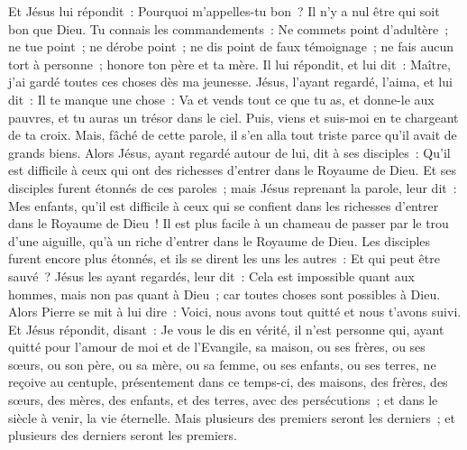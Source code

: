 \begin{multicols}{2}
Et Jésus lui répondit~: Pourquoi m'appelles-tu bon~? Il n'y a nul être qui soit bon que Dieu.
Tu connais les commandements~: Ne commets point d'adultère~; ne tue point~; ne dérobe point~; ne dis point de faux témoignage~; ne fais aucun tort à personne~; honore ton père et ta mère.
Il lui répondit, et lui dit~: Maître, j'ai gardé toutes ces choses dès ma jeunesse.
Jésus, l'ayant regardé, l'aima, et lui dit~: Il te manque une chose~: Va et vends tout ce que tu as, et donne-le aux pauvres, et tu auras un trésor dans le ciel. Puis, viens et suis-moi en te chargeant de ta croix.
Mais, fâché de cette parole, il s'en alla tout triste parce qu'il avait de grands biens.
Alors Jésus, ayant regardé autour de lui, dit à ses disciples~: Qu'il est difficile à ceux qui ont des richesses d'entrer dans le Royaume de Dieu.
Et ses disciples furent étonnés de ces paroles~; mais Jésus reprenant la parole, leur dit~: Mes enfants, qu'il est difficile à ceux qui se confient dans les richesses d'entrer dans le Royaume de Dieu~!
Il est plus facile à un chameau de passer par le trou d'une aiguille, qu'à un riche d'entrer dans le Royaume de Dieu.
Les disciples furent encore plus étonnés, et ils se dirent les uns les autres~: Et qui peut être sauvé~?
Jésus les ayant regardés, leur dit~: Cela est impossible quant aux hommes, mais non pas quant à Dieu~; car toutes choses sont possibles à Dieu.
Alors Pierre se mit à lui dire~: Voici, nous avons tout quitté et nous t'avons suivi.
Et Jésus répondit, disant~: Je vous le dis en vérité, il n'est personne qui, ayant quitté pour l'amour de moi et de l'Evangile, sa maison, ou ses frères, ou ses sœurs, ou son père, ou sa mère, ou sa femme, ou ses enfants, ou ses terres,
ne reçoive au centuple, présentement dans ce temps-ci, des maisons, des frères, des sœurs, des mères, des enfants, et des terres, avec des persécutions~; et dans le siècle à venir, la vie éternelle.
Mais plusieurs des premiers seront les derniers~; et plusieurs des derniers seront les premiers.

\end{multicols}
